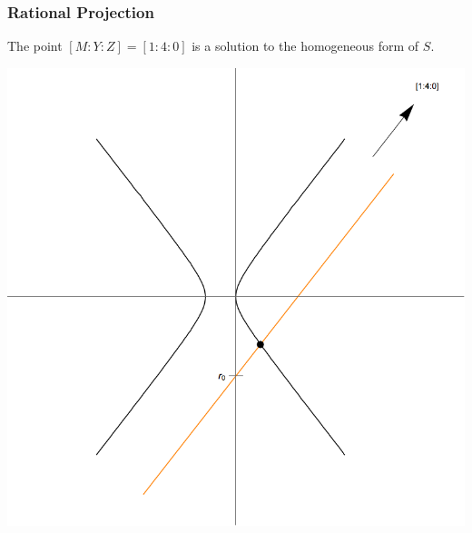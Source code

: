\begin{frame}
	\frametitle{Rational Projection}
	\begin{obs}
		The point $[M:Y:Z]=[1:4:0]$ is a solution to the homogeneous form of $S$.
	\end{obs}
	\pause
	\begin{center}
		\includegraphics[width=.5\textwidth]{projection-from-infinity.png}
	\end{center}
\end{frame}



























